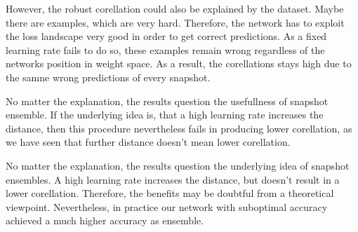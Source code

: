 However, the robust corellation could also be explained by the dataset. Maybe
there are examples, which are very hard. Therefore, the network has to exploit
the loss landscape very good in order to get correct predictions. As a fixed
learning rate fails to do so, these examples remain wrong regardless of the
networks position in weight space. As a result, the corellations stays high due
to the samne wrong predictions of every snapshot.

No matter the explanation, the results question the usefullness of snapshot
ensemble. If the underlying idea is, that a high learning rate increases the
distance, then this procedure nevertheless fails in producing lower
corellation, as we have seen that further distance doesn't mean lower corellation. 


No matter the explanation, the results question the underlying idea of snapshot
ensembles. A high learning rate increases the distance, but doesn't result in a
lower corellation. Therefore, the benefits may be doubtful from a theoretical
viewpoint. Nevertheless, in practice our network with suboptimal accuracy
achieved a much higher accuracy as ensemble. 


